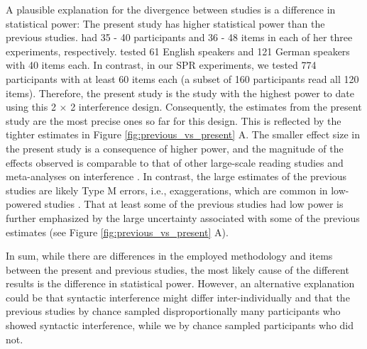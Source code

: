 \documentclass[review,preprint,12pt,authoryear,floatsintext]{elsarticle}
\begin{document}
{A plausible explanation for the divergence between studies is a difference in statistical power: The present study has higher statistical power than the previous studies. \citet{vandyke07} had 35 - 40 participants and 36 - 48 items in each of her three experiments, respectively. \cite{mertzen} tested 61 English speakers and 121 German speakers with 40 items each. In contrast, in our SPR experiments, we tested 774 participants with at least 60 items each (a subset of 160 participants read all 120 items). Therefore, the present study is the study with the highest power to date using this 2 $\times$ 2 interference design. Consequently, the estimates from the present study are the most precise ones so far for this design. This is reflected by the tighter estimates in Figure \ref{fig:previous_vs_present} A. The smaller effect size in the present study is a consequence of higher power, and the magnitude of the effects observed is comparable to that of other large-scale reading studies \citep{nicenboim} and meta-analyses on interference \citep{jaeger_etal_2017}. In contrast, the large estimates of the previous studies are likely Type M errors, i.e., exaggerations, which are common in low-powered studies \citep{gelman_carlin}. That at least some of the previous studies had low power is further emphasized by the large uncertainty associated with some of the previous estimates (see Figure \ref{fig:previous_vs_present} A).

In sum, while there are differences in the employed methodology and items between the present and previous studies, the most likely cause of the different results is the difference in statistical power. However, an alternative explanation could be that syntactic interference might differ inter-individually \citep{yadav2021individual} and that the previous studies by chance sampled disproportionally many participants who showed syntactic interference, while we by chance sampled participants who did not.

}
\end{document}
